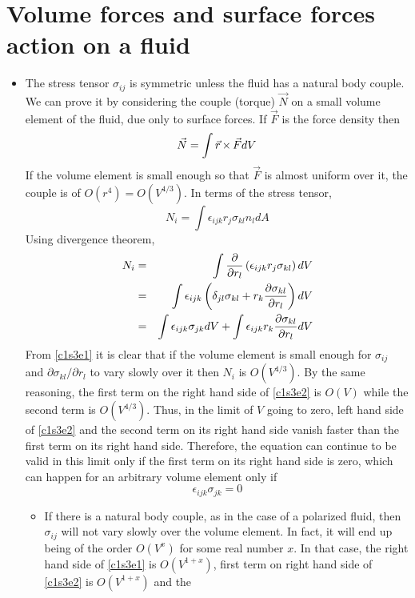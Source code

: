 \section{Volume forces and surface forces action on a fluid}\label{c1s3}
\begin{itemize}
\item The stress tensor $\sigma_{ij}$ is symmetric unless the fluid has a natural body couple. We can prove it by considering the couple (torque) $\vec{N}$ on a small volume element
of the fluid, due only to surface forces. If $\vec{F}$ is the force density then
\[
\vec{N} = \int \vec{r} \vp \vec{F} dV
\]
If the volume element is small enough so that $\vec{F}$ is almost uniform over it, the couple is of $O(r^4) = O(V^{4/3})$. In terms of the stress tensor, 
\begin{equation}\label{c1s3e1}
N_i = \int \epsilon_{ijk}r_j \sigma_{kl} n_l dA
\end{equation}
Using divergence theorem,
\begin{eqnarray}
N_i &=& \int \pdts{\epsilon_{ijk}r_j \sigma_{kl}}{r_l} dV \nonumber \\
 &=& \int \epsilon_{ijk}\left(\delta_{jl}\sigma_{kl} + r_k \pdt{\sigma_{kl}}{r_l}\right)dV \nonumber \\
 &=& \int \epsilon_{ijk}\sigma_{jk} dV + \int \epsilon_{ijk}r_k\pdt{\sigma_{kl}}{r_l} dV \label{c1s3e2}
\end{eqnarray}
From \eqref{c1s3e1} it is clear that if the volume element is small enough for $\sigma_{ij}$ and $\partial\sigma_{kl}/\partial r_l$ to vary slowly over it then $N_i$ is $O(V^{4/3})$. By 
the same reasoning, the first term on the right hand side of \eqref{c1s3e2} is $O(V)$ while the second term is $O(V^{4/3})$. Thus, in the limit of $V$ going to zero, left hand side of 
\eqref{c1s3e2} and the second term on its right hand side vanish faster than the first term on its right hand side. Therefore, the equation can continue to be valid in this limit only if 
the first term on its right hand side is zero, which can happen for an arbitrary volume element only if
\begin{equation}\label{c1s3e3}
\epsilon_{ijk}\sigma_{jk} = 0
\end{equation}
\begin{itemize}
\item If there is a natural body couple, as in the case of a polarized fluid, then $\sigma_{ij}$ will not vary slowly over the volume element. In fact, it will end up being of the order 
$O(V^x)$ for some real number $x$. In that case, the right hand side of \eqref{c1s3e1} is $O(V^{1 + x})$, first term on right hand side of \eqref{c1s3e2} is $O(V^{1 + x})$ and the

\end{itemize}
\end{itemize}
